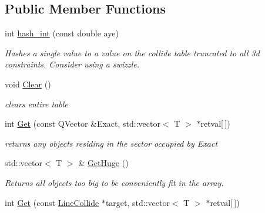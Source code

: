 \subsection*{Public Member Functions}
\begin{DoxyCompactItemize}
\item 
int \hyperlink{classHashtable3d_a47656ca4414fd32eeddb1b8d47575e2e}{hash\+\_\+int} (const double aye)\hypertarget{classHashtable3d_a47656ca4414fd32eeddb1b8d47575e2e}{}\label{classHashtable3d_a47656ca4414fd32eeddb1b8d47575e2e}

\begin{DoxyCompactList}\small\item\em Hashes a single value to a value on the collide table truncated to all 3d constraints. Consider using a swizzle. \end{DoxyCompactList}\item 
void \hyperlink{classHashtable3d_ab54ca803aa83f1fe7ad55618ae5728c9}{Clear} ()\hypertarget{classHashtable3d_ab54ca803aa83f1fe7ad55618ae5728c9}{}\label{classHashtable3d_ab54ca803aa83f1fe7ad55618ae5728c9}

\begin{DoxyCompactList}\small\item\em clears entire table \end{DoxyCompactList}\item 
int \hyperlink{classHashtable3d_afffd76fd7d3c83ada615b5315e8c5424}{Get} (const Q\+Vector \&Exact, std\+::vector$<$ T $>$ $\ast$retval\mbox{[}$\,$\mbox{]})\hypertarget{classHashtable3d_afffd76fd7d3c83ada615b5315e8c5424}{}\label{classHashtable3d_afffd76fd7d3c83ada615b5315e8c5424}

\begin{DoxyCompactList}\small\item\em returns any objects residing in the sector occupied by Exact \end{DoxyCompactList}\item 
std\+::vector$<$ T $>$ \& \hyperlink{classHashtable3d_ac5e963f02aedf9c6fd36063fa14a6239}{Get\+Huge} ()\hypertarget{classHashtable3d_ac5e963f02aedf9c6fd36063fa14a6239}{}\label{classHashtable3d_ac5e963f02aedf9c6fd36063fa14a6239}

\begin{DoxyCompactList}\small\item\em Returns all objects too big to be conveniently fit in the array. \end{DoxyCompactList}\item 
int \hyperlink{classHashtable3d_aa1337531f1c7f79da47799c849eeb578}{Get} (const \hyperlink{structLineCollide}{Line\+Collide} $\ast$target, std\+::vector$<$ T $>$ $\ast$retval\mbox{[}$\,$\mbox{]})\hypertarget{classHashtable3d_aa1337531f1c7f79da47799c849eeb578}{}\label{classHashtable3d_aa1337531f1c7f79da47799c849eeb578}


\end{DoxyCompactItemize}
